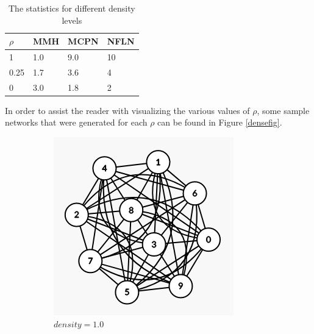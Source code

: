 \documentclass[letterpaper, 10 pt, conference]{ieeeconf}  %
\begin{document}
\begin{table}[H]
	\centering
	\begin{tabular}{l|l|l|l}
		$\rho$ & MMH & MCPN & NFLN \\ \hline
		1 & 1.0 & 9.0 &  10\\
		0.25    & 1.7 & 3.6 & 4 \\
		0    & 3.0 & 1.8  & 2 \\
	\end{tabular}
	\caption{The statistics for different density levels} \label{sparsedensities}
\end{table}

In order to assist the reader with visualizing the various values of $\rho$, some sample networks that were generated for each $\rho$ can be found in Figure \ref{densefig}.

\begin{figure}[H]
	\centering
	\begin{subfigure}[b]{0.15\textwidth}
		\centering
		\includegraphics[width=\textwidth]{sparsegraph100}
		\caption{$density=1.0$}
	\end{subfigure}
	\begin{subfigure}[b]{0.15\textwidth}
		\centering

\end{subfigure}
\end{figure}
\end{document}

